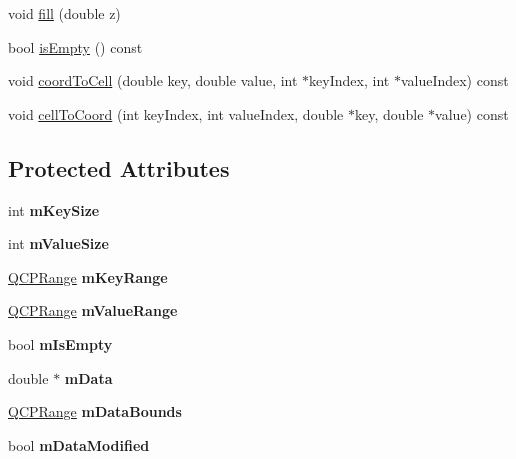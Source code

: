 \begin{DoxyCompactItemize}
\item 
void \hyperlink{classQCPColorMapData_a350f783260eb9b5de5c7b5e0d5d3e3c2}{fill} (double z)
\item 
bool \hyperlink{classQCPColorMapData_a986009324aee1fc5f696db46bd03dde5}{is\-Empty} () const 
\item 
void \hyperlink{classQCPColorMapData_a26e33c5ec7094b60136350bcd77d3737}{coord\-To\-Cell} (double key, double value, int $\ast$key\-Index, int $\ast$value\-Index) const 
\item 
void \hyperlink{classQCPColorMapData_ac96d6e84befe7b9951b5da6d4d4a2a47}{cell\-To\-Coord} (int key\-Index, int value\-Index, double $\ast$key, double $\ast$value) const 
\end{DoxyCompactItemize}
\subsection*{\-Protected \-Attributes}
\begin{DoxyCompactItemize}
\item 
\hypertarget{classQCPColorMapData_a354e06462023340fbc03894b22499f6d}{int {\bfseries m\-Key\-Size}}\label{classQCPColorMapData_a354e06462023340fbc03894b22499f6d}

\item 
\hypertarget{classQCPColorMapData_ae8ee9093632a59f55eb4fc06579ed256}{int {\bfseries m\-Value\-Size}}\label{classQCPColorMapData_ae8ee9093632a59f55eb4fc06579ed256}

\item 
\hypertarget{classQCPColorMapData_aaaafd0d7d0f153dbd152f3daf34254ee}{\hyperlink{classQCPRange}{\-Q\-C\-P\-Range} {\bfseries m\-Key\-Range}}\label{classQCPColorMapData_aaaafd0d7d0f153dbd152f3daf34254ee}

\item 
\hypertarget{classQCPColorMapData_a225bb96f10c1a27b51ae59249477dbef}{\hyperlink{classQCPRange}{\-Q\-C\-P\-Range} {\bfseries m\-Value\-Range}}\label{classQCPColorMapData_a225bb96f10c1a27b51ae59249477dbef}

\item 
\hypertarget{classQCPColorMapData_a10e91aa89ed05bd177b1f81e07b465b8}{bool {\bfseries m\-Is\-Empty}}\label{classQCPColorMapData_a10e91aa89ed05bd177b1f81e07b465b8}

\item 
\hypertarget{classQCPColorMapData_ac1682862022f575191351c9825187d39}{double $\ast$ {\bfseries m\-Data}}\label{classQCPColorMapData_ac1682862022f575191351c9825187d39}

\item 
\hypertarget{classQCPColorMapData_a1798b3dcc0a27091d196bfd156dcb3f2}{\hyperlink{classQCPRange}{\-Q\-C\-P\-Range} {\bfseries m\-Data\-Bounds}}\label{classQCPColorMapData_a1798b3dcc0a27091d196bfd156dcb3f2}

\item 
\hypertarget{classQCPColorMapData_ad3cc682da2ac14e5acdbc05cf4d3d93b}{bool {\bfseries m\-Data\-Modified}}\label{classQCPColorMapData_ad3cc682da2ac14e5acdbc05cf4d3d93b}

\end{DoxyCompactItemize}
